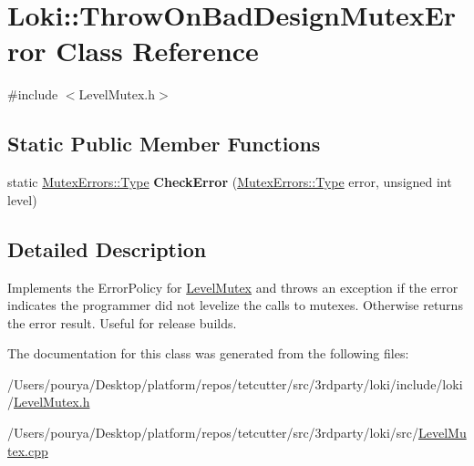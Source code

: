 \hypertarget{classLoki_1_1ThrowOnBadDesignMutexError}{}\section{Loki\+:\+:Throw\+On\+Bad\+Design\+Mutex\+Error Class Reference}
\label{classLoki_1_1ThrowOnBadDesignMutexError}


{\ttfamily \#include $<$Level\+Mutex.\+h$>$}

\subsection*{Static Public Member Functions}
\begin{DoxyCompactItemize}
\item 
\hypertarget{classLoki_1_1ThrowOnBadDesignMutexError_acc8fc275ab23531a90aec3c646237c50}{}static \hyperlink{classLoki_1_1MutexErrors_acd0eb6065ca303083d2e0229d7bff590}{Mutex\+Errors\+::\+Type} {\bfseries Check\+Error} (\hyperlink{classLoki_1_1MutexErrors_acd0eb6065ca303083d2e0229d7bff590}{Mutex\+Errors\+::\+Type} error, unsigned int level)\label{classLoki_1_1ThrowOnBadDesignMutexError_acc8fc275ab23531a90aec3c646237c50}

\end{DoxyCompactItemize}


\subsection{Detailed Description}
Implements the Error\+Policy for \hyperlink{classLoki_1_1LevelMutex}{Level\+Mutex} and throws an exception if the error indicates the programmer did not levelize the calls to mutexes. Otherwise returns the error result. Useful for release builds. 

The documentation for this class was generated from the following files\+:\begin{DoxyCompactItemize}
\item 
/\+Users/pourya/\+Desktop/platform/repos/tetcutter/src/3rdparty/loki/include/loki/\hyperlink{LevelMutex_8h}{Level\+Mutex.\+h}\item 
/\+Users/pourya/\+Desktop/platform/repos/tetcutter/src/3rdparty/loki/src/\hyperlink{LevelMutex_8cpp}{Level\+Mutex.\+cpp}\end{DoxyCompactItemize}
